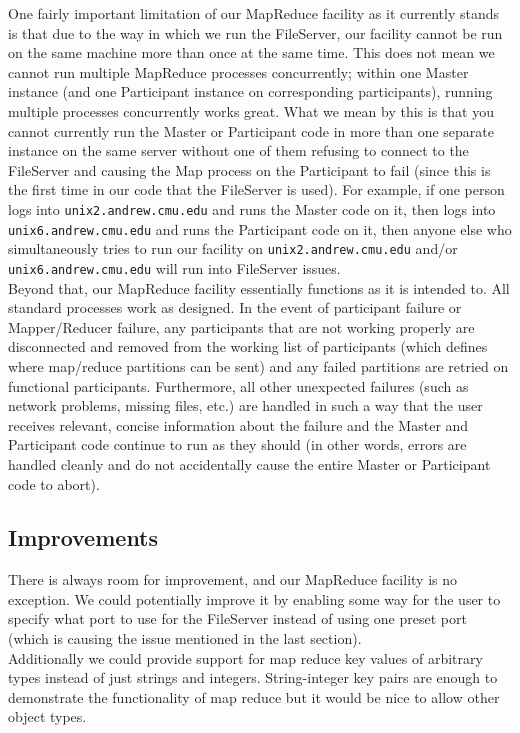 \documentclass[12pt]{article}
\begin{document}
One fairly important limitation of our MapReduce facility as it currently stands is that due to the way in which we run the FileServer, our facility cannot be run on the same machine more than once at the same time. This does not mean we cannot run multiple MapReduce processes concurrently; within one Master instance (and one Participant instance on corresponding participants), running multiple processes concurrently works great. What we mean by this is that you cannot currently run the Master or Participant code in more than one separate instance on the same server without one of them refusing to connect to the FileServer and causing the Map process on the Participant to fail (since this is the first time in our code that the FileServer is used). For example, if one person logs into \verb|unix2.andrew.cmu.edu| and runs the Master code on it, then logs into \verb|unix6.andrew.cmu.edu| and runs the Participant code on it, then anyone else who simultaneously tries to run our facility on \verb|unix2.andrew.cmu.edu| and/or \verb|unix6.andrew.cmu.edu| will run into FileServer issues.\\

Beyond that, our MapReduce facility essentially functions as it is intended to. All standard processes work as designed. In the event of participant failure or Mapper/Reducer failure, any participants that are not working properly are disconnected and removed from the working list of participants (which defines where map/reduce partitions can be sent) and any failed partitions are retried on functional participants. Furthermore, all other unexpected failures (such as network problems, missing files, etc.) are handled in such a way that the user receives relevant, concise information about the failure and the Master and Participant code continue to run as they should (in other words, errors are handled cleanly and do not accidentally cause the entire Master or Participant code to abort).

\subsection{Improvements}

There is always room for improvement, and our MapReduce facility is no exception. We could potentially improve it by enabling some way for the user to specify what port to use for the FileServer instead of using one preset port (which is causing the issue mentioned in the last section). \\

Additionally we could provide support for map reduce key values of arbitrary types instead of just strings and integers. String-integer key pairs are enough to demonstrate the functionality of map reduce but it would be nice to allow other object types.
\end{document}
